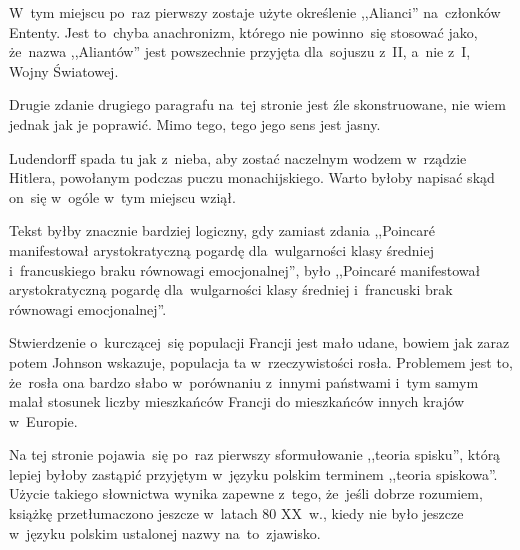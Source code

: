 \documentclass[a4paper,11pt]{article}
\begin{document}
\vspace{\spaceFour}


\start {} W~tym miejscu po~raz pierwszy zostaje użyte
określenie ,,Alianci'' na~członków Ententy. Jest to~chyba anachronizm,
którego nie powinno~się stosować jako, że~nazwa ,,Aliantów'' jest
powszechnie przyjęta dla~sojuszu z~II, a~nie z~I, Wojny Światowej.

\vspace{\spaceFour}


\start {} Drugie zdanie drugiego paragrafu na~tej stronie jest
źle skonstruowane, nie wiem jednak jak je poprawić. Mimo tego, tego
jego sens jest jasny.

\vspace{\spaceFour}


\start {} Ludendorff spada tu jak z~nieba, aby zostać naczelnym
wodzem w~rządzie Hitlera, powołanym podczas puczu monachijskiego.
Warto byłoby napisać skąd on~się w~ogóle w~tym miejscu wziął.

\vspace{\spaceFour}


\start {} Tekst byłby znacznie bardziej logiczny, gdy
zamiast zdania ,,Poincar\'{e} manifestował arystokratyczną pogardę
dla~wulgarności klasy średniej i~francuskiego braku równowagi
emocjonalnej'', było ,,Poincar\'{e} manifestował arystokratyczną
pogardę dla~wulgarności klasy średniej i~francuski brak równowagi
emocjonalnej''.

\vspace{\spaceFour}


\start {} Stwierdzenie o~kurczącej~się populacji Francji jest
mało udane, bowiem jak zaraz potem Johnson wskazuje, populacja ta
w~rzeczywistości rosła. Problemem jest to, że~rosła ona bardzo słabo
w~porównaniu z~innymi państwami i~tym samym malał stosunek liczby
mieszkańców Francji do mieszkańców innych krajów w~Europie.

\vspace{\spaceFour}


\start {} Na tej stronie pojawia~się po~raz pierwszy
sformułowanie ,,teoria spisku'', którą lepiej byłoby zastąpić
przyjętym w~języku polskim terminem ,,teoria spiskowa''. Użycie
takiego słownictwa wynika zapewne z~tego, że~jeśli dobrze rozumiem,
książkę przetłumaczono jeszcze w~latach 80 XX~w., kiedy nie było
jeszcze w~języku polskim ustalonej nazwy na~to~zjawisko.

\vspace{\spaceFour}
\end{document}
